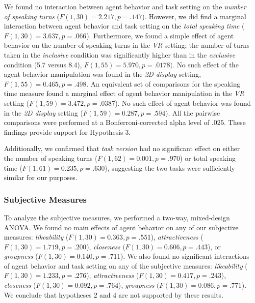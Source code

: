 We found no interaction between agent behavior and task setting on the \emph{number of speaking turns} ($F(1, 30) = 2.217, p = .147$). However, we did find a marginal interaction between agent behavior and task setting on the \emph{total speaking time} ($F(1, 30) = 3.637, p = .066$). Furthermore, we found a simple effect of agent behavior on the number of speaking turns in the \emph{VR} setting; the number of turns taken in the \emph{inclusive} condition was significantly higher than in the \emph{exclusive} condition (5.7 versus 8.4), $F(1, 55) = 5.970, p = .0178)$. No such effect of the agent behavior manipulation was found in the \emph{2D display} setting, $F(1, 55) = 0.465, p = .498$. An equivalent set of comparisons for the speaking time measure found a marginal effect of agent behavior manipulation in the \emph{VR} setting ($F(1, 59) = 3.472, p = .0387$). No such effect of agent behavior was found in the \emph{2D display} setting ($F(1, 59) = 0.287, p = .594$). All the pairwise comparisons were performed at a Bonferroni-corrected alpha level of $.025$. These findings provide support for Hypothesis 3.

Additionally, we confirmed that \emph{task version} had no significant effect on either the number of speaking turns ($F(1, 62) = 0.001, p = .970$) or total speaking time ($F(1, 61) = 0.235, p = .630$), suggesting the two tasks were sufficiently similar for our purposes.

\subsubsection{Subjective Measures}

To analyze the subjective measures, we performed a two-way, mixed-design ANOVA. We found no main effects of agent behavior on any of our subjective measures: \emph{likeability} ($F(1, 30) = 0.363, p = .551$), \emph{attractiveness} ($F(1, 30) = 1.719, p = .200$), \emph{closeness} ($F(1, 30) = 0.606, p = .443$), or \emph{groupness} ($F(1, 30) = 0.140, p = .711$). We also found no significant interactions of agent behavior and task setting on any of the subjective measures: \emph{likeability} ($F(1, 30) = 1.233, p = .276$), \emph{attractiveness} ($F(1, 30) = 0.417, p = .243$), \emph{closeness} ($F(1, 30) = 0.092, p = .764$), \emph{groupness} $(F(1, 30) = 0.086, p = .771$). We conclude that hypotheses 2 and 4 are not supported by these results.

